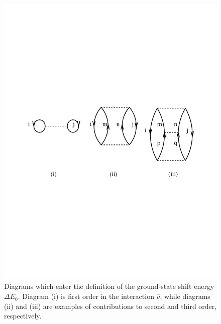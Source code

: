 \documentclass[%
oneside,                 %
final,                   %
10pt]{article}
\begin{document}
\begin{figure}[t]
  \centerline{\includegraphics[width=0.6\linewidth]{fig-inf/goldstone.pdf}}
  \caption{
  Diagrams which enter the definition of the ground-state shift energy $\Delta E_0$. Diagram (i) is first order in the interaction $\hat{v}$, while diagrams (ii) and (iii) are examples of contributions to second and third order, respectively. \label{fig:goldstone}
  }
\end{figure}
\end{document}
